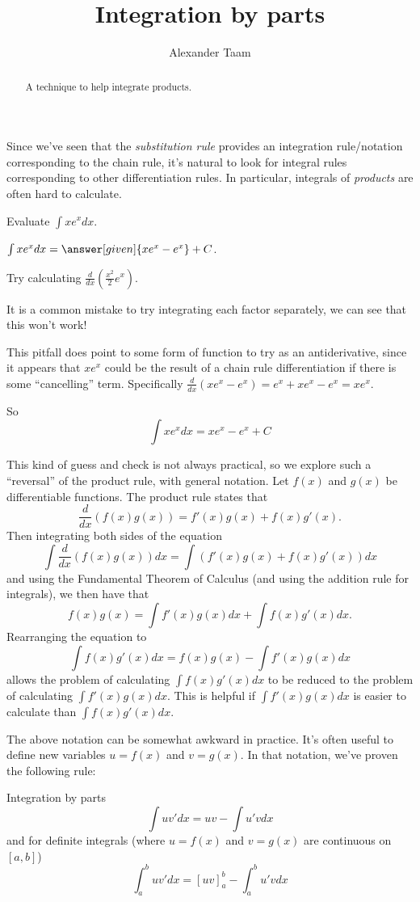 \documentclass{ximera}
\title{Integration by parts}
\author{Alexander Taam}
\begin{document}
\begin{abstract}
  A technique to help integrate products.
\end{abstract}
\maketitle

Since we've seen that the \emph{substitution rule} provides an integration rule/notation corresponding to the chain rule, it's natural to look for integral rules corresponding to other differentiation rules. In particular, integrals of \emph{products} are often hard to calculate.

\begin{problem}
Evaluate $\int xe^xdx$.

$\int xe^xdx = \answer[given]{xe^x-e^x}+C$.
\begin{hint}
Try calculating $\frac{d}{dx}(\frac{x^2}{2}e^x)$.

It is a common mistake to try integrating each factor separately, we can see that this won't work!
\end{hint}
\begin{feedback}
This pitfall does point to some form of function to try as an antiderivative, since it appears that $xe^x$ could be the result of a chain rule differentiation if there is some ``cancelling'' term. Specifically $\frac{d}{dx}(xe^x-e^x)=e^x+xe^x-e^x=xe^x$. 

So \[\int xe^xdx=xe^x-e^x+C\]
\end{feedback}

\end{problem}


This kind of guess and check is not always practical, so we explore such a ``reversal'' of the product rule, with general notation. Let $f(x)$ and $g(x)$ be differentiable functions. The product rule states that $$\frac{d}{dx}(f(x)g(x))=f'(x)g(x)+f(x)g'(x).$$ Then integrating both sides of the equation
$$\int \frac{d}{dx}(f(x)g(x))dx=\int \left(f'(x)g(x)+f(x)g'(x)\right)dx$$
and using the Fundamental Theorem of Calculus (and using the addition rule for integrals), we then have that 
$$f(x)g(x)=\int f'(x)g(x)dx+\int f(x)g'(x)dx.$$
Rearranging the equation to
$$\int f(x)g'(x)dx=f(x)g(x)-\int f'(x)g(x)dx$$
allows the problem of calculating $\int f(x)g'(x)dx$ to be reduced to the problem of calculating $\int f'(x)g(x)dx$. This is helpful if $\int f'(x)g(x)dx$ is easier to calculate than $\int f(x)g'(x)dx$.

The above notation can be somewhat awkward in practice. It's often useful to define new variables $u=f(x)$ and $v=g(x)$. In that notation, we've proven the following rule:
\begin{theorem}{Integration by parts}\label{int-rule-parts}
$$\int uv'dx=uv-\int u'vdx$$
and for definite integrals (where $u=f(x)$ and $v=g(x)$ are continuous on $[a,b]$)
$$\int_a^b uv'dx=[uv]_a^b-\int_a^b u'vdx$$
\end{theorem}
\end{document}
